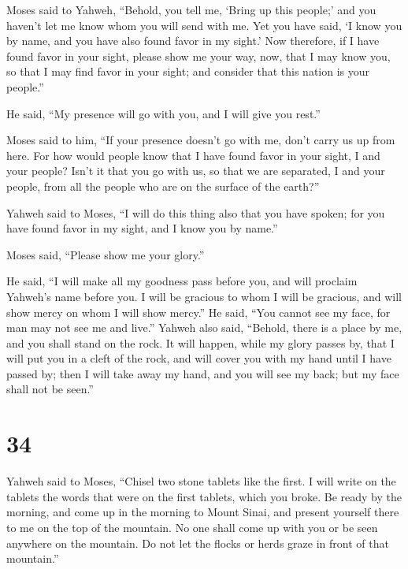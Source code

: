  Moses said to Yahweh, ``Behold, you tell me, `Bring up
this people;' and you haven't let me know whom you will send with me.
Yet you have said, `I know you by name, and you have also found favor in
my sight.'  Now therefore, if I have found favor in your
sight, please show me your way, now, that I may know you, so that I may
find favor in your sight; and consider that this nation is your
people.''

 He said, ``My presence will go with you, and I will give
you rest.''

 Moses said to him, ``If your presence doesn't go with
me, don't carry us up from here.  For how would people
know that I have found favor in your sight, I and your people? Isn't it
that you go with us, so that we are separated, I and your people, from
all the people who are on the surface of the earth?''

 Yahweh said to Moses, ``I will do this thing also that
you have spoken; for you have found favor in my sight, and I know you by
name.''

 Moses said, ``Please show me your glory.''

 He said, ``I will make all my goodness pass before you,
and will proclaim Yahweh's name before you. I will be gracious to whom I
will be gracious, and will show mercy on whom I will show mercy.''
 He said, ``You cannot see my face, for man may not see
me and live.''  Yahweh also said, ``Behold, there is a
place by me, and you shall stand on the rock.  It will
happen, while my glory passes by, that I will put you in a cleft of the
rock, and will cover you with my hand until I have passed by;
 then I will take away my hand, and you will see my back;
but my face shall not be seen.''

\hypertarget{section-33}{%
\section{34}\label{section-33}}

 Yahweh said to Moses, ``Chisel two stone tablets like the
first. I will write on the tablets the words that were on the first
tablets, which you broke.  Be ready by the morning, and
come up in the morning to Mount Sinai, and present yourself there to me
on the top of the mountain.  No one shall come up with you
or be seen anywhere on the mountain. Do not let the flocks or herds
graze in front of that mountain.''

